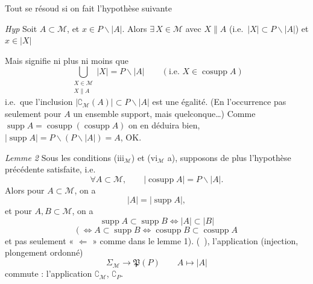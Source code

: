 \documentclass[11pt,a4paper]{article}
\begin{document}
Tout se résoud si on fait l'hypothèse suivante

\emph{Hyp} \quad Soit $A \subset \mathcal{M}$, et $x \in P \smallsetminus |A|$. Alors $\exists\, X \in \mathcal{M}$ avec \struck{\ill{}} $X \parallel A$ (i.e.\ $|X| \subset P \smallsetminus |A|$) et $x \in |X|$

Mais  signifie ni plus ni moins que
\[
  \bigcup_{\substack{X \in \mathcal{M} \\ X \parallel A}} |X| = P \smallsetminus |A|
  \qquad (\text{i.e.\ } X \in \operatorname{cosupp} A)
\]
i.e.\ que l'inclusion $|\complement_{\mathcal{M}}(A)| \subset P \smallsetminus |A|$ est une égalité. (En l'occurrence pas seulement pour $A$ \struck{\ill{}} un ensemble support, mais quelconque…) Comme $\operatorname{supp} A = \operatorname{cosupp}(\operatorname{cosupp} A)$ on en déduira bien, $|\operatorname{supp} A| = P \smallsetminus (P \smallsetminus |A|) = A$, OK.

\emph{Lemme 2} \quad Sous les conditions (iii$_{\mathcal{M}}$) et (vi$_{\mathcal{M}}$ a), supposons de plus l'hypothèse précédente satisfaite, i.e.
\[
  \forall A \subset \mathcal{M}, \qquad |\operatorname{cosupp} A| = P \smallsetminus |A| .
\]
Alors pour  $A \subset \mathcal{M}$, on a
\[
  |A| = |\operatorname{supp} A| ,
\]
et pour $A, B \subset \mathcal{M}$, on a
\[
  \operatorname{supp} A \subset \operatorname{supp} B \iff |A| \subset |B|
\]
\[
  (\ \iff A \subset \operatorname{supp} B \iff \operatorname{cosupp} B \subset \operatorname{cosupp} A
\]
et pas seulement « $\Leftarrow$ » comme dans le lemme 1).  (\ ), l'application (injection, plongement ordonné)
\[
  \Sigma_{\mathcal{M}} \longrightarrow \mathfrak{P}(P) \qquad A \longmapsto |A|
\]
commute : l'application $\complement_{\mathcal{M}}$, $\complement_{P}$.
\end{document}
